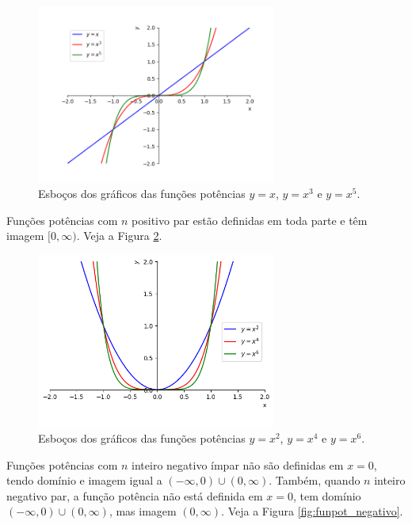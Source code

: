 \begin{figure}[H]
  \centering
  \includegraphics[width=0.7\textwidth]{./cap_funcao/dados/fig_funpot_impar/fig_funpot_impar}
  \caption{Esboços dos gráficos das funções potências $y=x$, $y=x^3$ e $y=x^5$.}
  \label{fig:funpot_impar}
\end{figure}

Funções potências com $n$ positivo par estão definidas em toda parte e têm imagem $[0, \infty)$. Veja a Figura \ref{fig:funpot_par}.

\begin{figure}[H]
  \centering
  \includegraphics[width=0.7\textwidth]{./cap_funcao/dados/fig_funpot_par/fig_funpot_par}
  \caption{Esboços dos gráficos das funções potências $y=x^2$, $y=x^4$ e $y=x^6$.}
  \label{fig:funpot_par}
\end{figure}

Funções potências com $n$ inteiro negativo ímpar não são definidas em $x=0$, tendo domínio e imagem igual a $(-\infty, 0)\cup (0, \infty)$. Também, quando $n$ inteiro negativo par, a função potência não está definida em $x=0$, tem domínio $(-\infty, 0)\cup (0, \infty)$, mas imagem $(0, \infty)$. Veja a Figura \ref{fig:funpot_negativo}.


